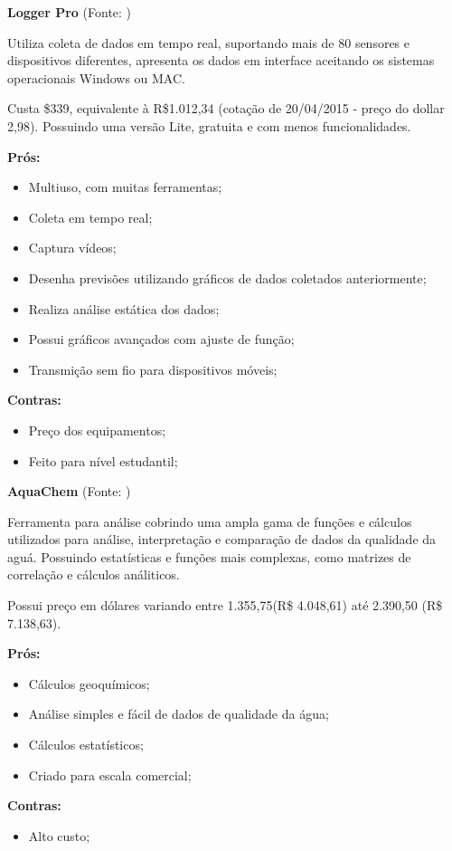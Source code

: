  
\noindent
\textbf{Logger Pro} (Fonte: \citeauthor{loggerPro})

	Utiliza coleta de dados em tempo real, suportando mais de 80 sensores e dispositivos diferentes, apresenta os dados
	em interface aceitando os sistemas operacionais Windows ou MAC.
	
	Custa \$339, equivalente à R\$1.012,34 (cotação de 20/04/2015 - preço do dollar 2,98). Possuindo uma versão Lite,
	gratuita e com menos funcionalidades.
	
\textbf{Prós:}
	
\begin{itemize}
  \item Multiuso, com muitas ferramentas;
  \item Coleta em tempo real;
  \item Captura vídeos;
  \item Desenha previsões utilizando gráficos de dados coletados anteriormente;
  \item Realiza análise estática dos dados;
  \item Possui gráficos avançados com ajuste de função;
  \item Transmição sem fio para dispositivos móveis;
 \end{itemize}
 
\textbf{Contras:}
	
\begin{itemize}
  \item Preço dos equipamentos;
  \item Feito para nível estudantil;\\
 \end{itemize}
 

\noindent
\textbf{AquaChem} (Fonte: \citeauthor{aquaChem})

	Ferramenta para análise cobrindo uma ampla gama de funções e cálculos utilizados para análise, interpretação 
	e comparação de dados da qualidade da aguá. Possuindo estatísticas e funções mais complexas, como matrizes de
	correlação e cálculos análiticos.
	
	Possui preço em dólares variando entre 1.355,75(R\$ 4.048,61) até 2.390,50 (R\$ 7.138,63).
	
\textbf{Prós:}
	
\begin{itemize}
  \item Cálculos geoquímicos;
  \item Análise simples e fácil de dados de qualidade da água;
  \item Cálculos estatísticos;
  \item Criado para escala comercial;
\end{itemize}
 
\textbf{Contras:}
	
\begin{itemize}
  \item Alto custo;
\end{itemize}